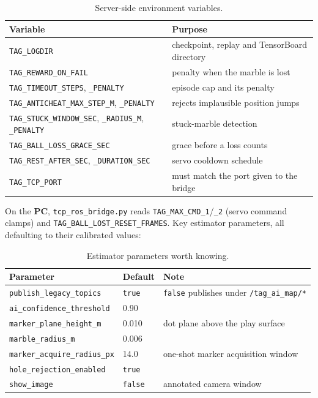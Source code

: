 \documentclass[11pt,a4paper]{article}
\newcommand{\cmd}[1]{\texttt{\small #1}}
\newcommand{\file}[1]{\texttt{\small #1}}
\newcommand{\topicname}[1]{\texttt{\small #1}}
\begin{document}
\begin{table}[h]
\centering\small
\begin{tabular}{@{}ll@{}}
\toprule
\textbf{Variable} & \textbf{Purpose} \\
\midrule
\cmd{TAG\_LOGDIR} & checkpoint, replay and TensorBoard directory \\
\cmd{TAG\_REWARD\_ON\_FAIL} & penalty when the marble is lost \\
\cmd{TAG\_TIMEOUT\_STEPS}, \cmd{\_PENALTY} & episode cap and its penalty \\
\cmd{TAG\_ANTICHEAT\_MAX\_STEP\_M}, \cmd{\_PENALTY} & rejects implausible position jumps \\
\cmd{TAG\_STUCK\_WINDOW\_SEC}, \cmd{\_RADIUS\_M}, \cmd{\_PENALTY} & stuck-marble detection \\
\cmd{TAG\_BALL\_LOSS\_GRACE\_SEC} & grace before a loss counts \\
\cmd{TAG\_REST\_AFTER\_SEC}, \cmd{\_DURATION\_SEC} & servo cooldown schedule \\
\cmd{TAG\_TCP\_PORT} & must match the port given to the bridge \\
\bottomrule
\end{tabular}
\caption{Server-side environment variables.}
\end{table}

On the \textbf{PC}, \file{tcp\_ros\_bridge.py} reads
\cmd{TAG\_MAX\_CMD\_1}/\cmd{\_2} (servo command clamps) and
\cmd{TAG\_BALL\_LOST\_RESET\_FRAMES}. Key estimator parameters, all defaulting to
their calibrated values:

\begin{table}[h]
\centering\small
\begin{tabular}{@{}lll@{}}
\toprule
\textbf{Parameter} & \textbf{Default} & \textbf{Note} \\
\midrule
\cmd{publish\_legacy\_topics} & \cmd{true} & \cmd{false} publishes under \topicname{/tag\_ai\_map/*} \\
\cmd{ai\_confidence\_threshold} & 0.90 & \\
\cmd{marker\_plane\_height\_m} & 0.010 & dot plane above the play surface \\
\cmd{marble\_radius\_m} & 0.006 & \\
\cmd{marker\_acquire\_radius\_px} & 14.0 & one-shot marker acquisition window \\
\cmd{hole\_rejection\_enabled} & \cmd{true} & \\
\cmd{show\_image} & \cmd{false} & annotated camera window \\
\bottomrule
\end{tabular}
\caption{Estimator parameters worth knowing.}
\end{table}
\end{document}

